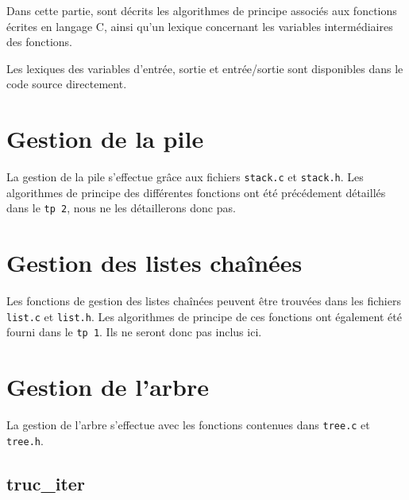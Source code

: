Dans cette partie, sont décrits les algorithmes de principe associés aux fonctions écrites en langage C, ainsi qu'un lexique concernant les variables intermédiaires des fonctions.

Les lexiques des variables d'entrée, sortie et entrée/sortie sont disponibles dans le code source directement.

\section{Gestion de la pile}
  La gestion de la pile s'effectue grâce aux fichiers \texttt{stack.c} et \texttt{stack.h}.
  Les algorithmes de principe des différentes fonctions ont été précédement détaillés dans le \texttt{tp 2}, nous ne les détaillerons donc pas.

\section{Gestion des listes chaînées}
  Les fonctions de gestion des listes chaînées peuvent être trouvées dans les fichiers \texttt{list.c} et \texttt{list.h}.
  Les algorithmes de principe de ces fonctions ont également été fourni dans le \texttt{tp 1}. Ils ne seront donc pas inclus ici.

\section{Gestion de l'arbre}
  La gestion de l'arbre s'effectue avec les fonctions contenues dans \texttt{tree.c} et \texttt{tree.h}.
    
  \newpage
  \subsection{truc\_iter}
    \begin{algo}[informal] %
      \BEGIN
        \RETURN{}
      \END
    \end{algo}

    \begin{algo}[informal] %
      \VAR
        \DECLVAR{}{}
      \ENDVAR
    \end{algo}
